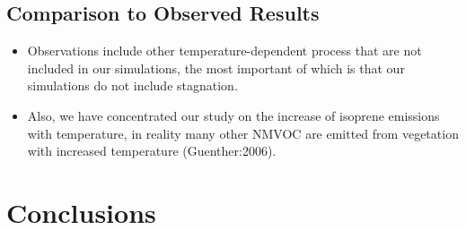\documentclass[11pt,a4paper]{article}
\begin{document}
\subsection{Comparison to Observed Results}
\begin{itemize}
    \item Observations include other temperature-dependent process that are not included in our simulations, the most important of which is that our simulations do not include stagnation.
    \item Also, we have concentrated our study on the increase of isoprene emissions with temperature, in reality many other NMVOC are emitted from vegetation with increased temperature (Guenther:2006).
\end{itemize}

\section{Conclusions} \label{s:conclusions}
\end{document}
